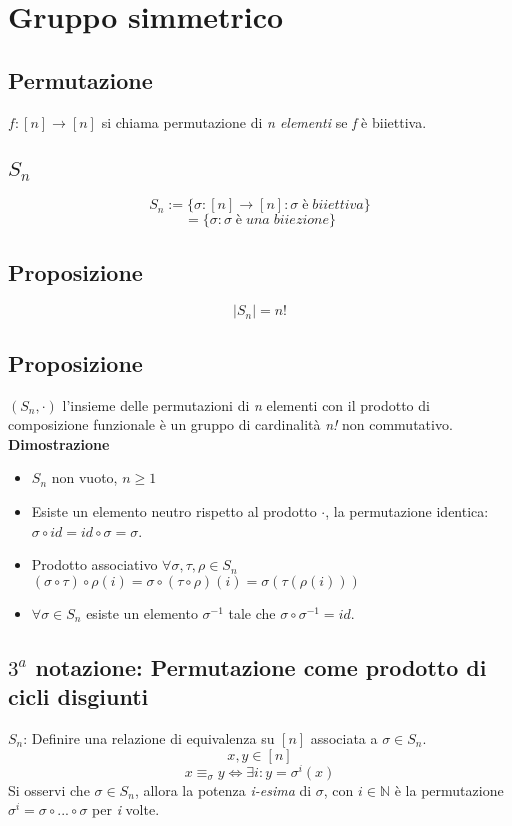 \section{Gruppo simmetrico}

\subsection{Permutazione}
\(f:[n]\rightarrow [n]\) si chiama permutazione di \textit{n elementi} se \textit{f} è biiettiva.

\subsection{\(S_n\)}
\[S_n:=\{\sigma : [n]\rightarrow[n] : \sigma\;è\;biiettiva\}\]
\[=\{\sigma : \sigma\;è\;una\;biiezione\}\]

\subsection{Proposizione}
\[|S_n|=n!\]

\subsection{Proposizione}
\((S_n,\cdot)\) l'insieme delle permutazioni di \textit{n} elementi con il prodotto di composizione funzionale è un gruppo di cardinalità \textit{n!} non commutativo.
\\
\textbf{Dimostrazione}
\begin{itemize}
    \item \(S_n\) non vuoto, \(n\geq 1\)
    
    \item Esiste un elemento neutro rispetto al prodotto \(\cdot\), la permutazione identica: \(\sigma\circ id=id\circ\sigma=\sigma\).
    
    \item Prodotto associativo \(\forall\sigma ,\tau ,\rho\in S_n\) \((\sigma\circ \tau )\circ\rho (i)=\sigma\circ (\tau\circ\rho )(i)=\sigma ( \tau (\rho (i)))\)
    
    \item \(\forall\sigma\in S_n\) esiste un elemento \(\sigma ^{-1}\) tale che \(\sigma\circ\sigma ^{-1}=id\).
\end{itemize}

\subsection{\(3^a\) notazione: Permutazione come prodotto di cicli disgiunti}
\(S_n\): Definire una relazione di equivalenza su \([n]\) associata a \(\sigma \in S_n\).
\[x,y\in [n]\]
\[x\equiv _\sigma y\Leftrightarrow \exists i : y=\sigma ^i(x)\]
Si osservi che \(\sigma\in S_n\), allora la potenza \textit{i-esima} di \(\sigma\), con \(i\in\mathbb{N}\) è la permutazione \(\sigma ^i =\sigma\circ ...\circ\sigma\) per \textit{i} volte.

